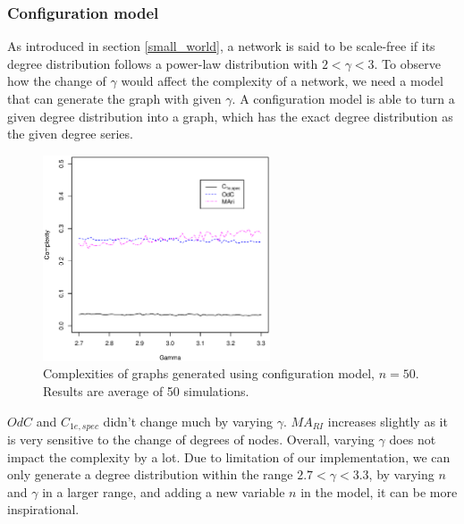 \documentclass[12pt]{article}
\begin{document}
\subsubsection{Configuration model}
\label{configuration_model}
As introduced in section \ref{small_world}, a network is said to be scale-free if its degree distribution follows a power-law distribution with $2<\gamma <3$. To observe how the change of $\gamma$ would affect the complexity of a network, we need a model that can generate the graph with given $\gamma$. A configuration model \cite{newmanbook} is able to turn a given degree distribution into a graph, which has the exact degree distribution as the given degree series. 
\begin{figure}[h]
    \centering
    \includegraphics[width=0.6\textwidth]{configuration_model.eps}
    \caption{Complexities of graphs generated using configuration model, $n=50$. Results are average of 50 simulations.}
    \label{fig:configuration_model}
\end{figure}
\par
$OdC$ and $C_{1e,spec}$ didn't change much by varying $\gamma$. $MA_{RI}$ increases slightly as it is very sensitive to the change of degrees of nodes. Overall, varying $\gamma$ does not impact the complexity by a lot. Due to limitation of our implementation, we can only generate a degree distribution within the range $2.7<\gamma<3.3$, by varying $n$ and $\gamma$ in a larger range, and adding a new variable $n$ in the model, it can be more inspirational. 
\end{document}

